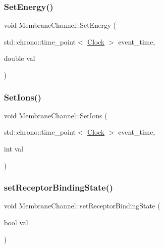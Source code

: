\subsubsection{\texorpdfstring{Set\+Energy()}{SetEnergy()}}
{\footnotesize\ttfamily void Membrane\+Channel\+::\+Set\+Energy (\begin{DoxyParamCaption}\item[{std\+::chrono\+::time\+\_\+point$<$ \mbox{\hyperlink{universe_8h_a0ef8d951d1ca5ab3cfaf7ab4c7a6fd80}{Clock}} $>$}]{event\+\_\+time,  }\item[{double}]{val }\end{DoxyParamCaption})\hspace{0.3cm}{\ttfamily [inline]}}

\mbox{\label{classMembraneChannel_a1fe0c61eccbb6aa0d905ead27e8337bd}} 
\subsubsection{\texorpdfstring{Set\+Ions()}{SetIons()}}
{\footnotesize\ttfamily void Membrane\+Channel\+::\+Set\+Ions (\begin{DoxyParamCaption}\item[{std\+::chrono\+::time\+\_\+point$<$ \mbox{\hyperlink{universe_8h_a0ef8d951d1ca5ab3cfaf7ab4c7a6fd80}{Clock}} $>$}]{event\+\_\+time,  }\item[{int}]{val }\end{DoxyParamCaption})\hspace{0.3cm}{\ttfamily [inline]}}

\mbox{\label{classMembraneChannel_a9f5c69ab1f4dce6113fceebaaa4f15f4}} 
\subsubsection{\texorpdfstring{set\+Receptor\+Binding\+State()}{setReceptorBindingState()}}
{\footnotesize\ttfamily void Membrane\+Channel\+::set\+Receptor\+Binding\+State (\begin{DoxyParamCaption}\item[{bool}]{val }\end{DoxyParamCaption})\hspace{0.3cm}{\ttfamily [inline]}}

